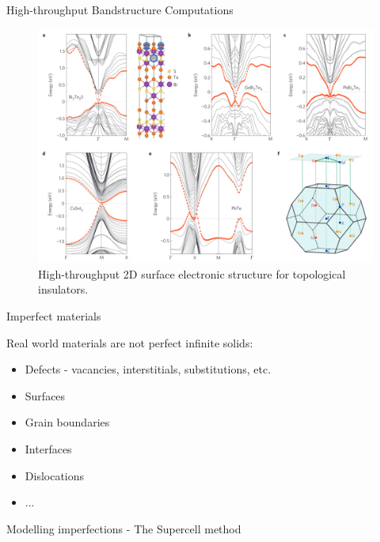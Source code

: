\documentclass[aspectratio=169]{beamer}
\begin{document}
\begin{frame}{High-throughput Bandstructure Computations}
\begin{figure}
    \centering
    \includegraphics[width=0.5\linewidth]{lectures/figures/8_HT_Bandstructure.png}
    \caption{High-throughput 2D surface electronic structure for topological insulators.\cite{yangSearchModelTopological2012}}
\end{figure} 
\end{frame} 

\begin{frame}{Imperfect materials}

Real world materials are not perfect infinite solids:
\begin{itemize}
    \item Defects - vacancies, interstitials, substitutions, etc.
    \item Surfaces
    \item Grain boundaries
    \item Interfaces
    \item Dislocations
    \item ...
\end{itemize}

\end{frame} 

\begin{frame}{Modelling imperfections - The Supercell method}

\begin{figure}
    \centering
{}
\end{figure}

\end{frame} 
\end{document}
